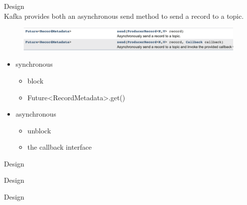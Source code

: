 \begin{frame}[plain,t]{Design} %
     \\
    \vspace{2ex}
    Kafka provides both an asynchronous send method to send a record to a topic.
    
    \begin{figure}
        \centering
        \includegraphics[width=0.7\linewidth]{image/0204}
        \label{fig:0204}
    \end{figure}
    
    
    \begin{itemize}
        \item synchronous
        \begin{itemize}
            \item block
            \item Future<RecordMetadata>.get()
        \end{itemize}
        \item asynchronous
        \begin{itemize}
            \item unblock
            \item the callback interface
        \end{itemize}
    \end{itemize}




    
    
\end{frame}
\begin{frame}[plain,t]{Design} %
     \\
    \vspace{2ex}
    
    
    
\end{frame}
\begin{frame}[plain,t]{Design} %
     \\
    \vspace{2ex}
    
    
    
\end{frame}
\begin{frame}[plain,t]{Design} %
     \\
    \vspace{2ex}
    
    
    
\end{frame}


